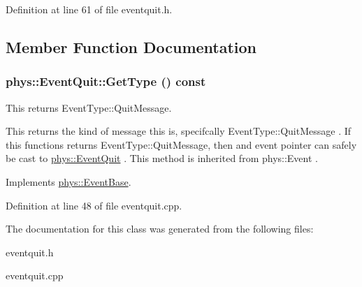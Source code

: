 Definition at line 61 of file eventquit.h.



\subsection{Member Function Documentation}
\hypertarget{classphys_1_1EventQuit_a3bfca875349e73dbda47c3c62a253e3b}{
\subsubsection[{GetType}]{ phys::EventQuit::GetType () const}}
\label{dd/dea/classphys_1_1EventQuit_a3bfca875349e73dbda47c3c62a253e3b}


This returns EventType::QuitMessage. 

This returns the kind of message this is, specifcally EventType::QuitMessage . If this functions returns EventType::QuitMessage, then and event pointer can safely be cast to \hyperlink{classphys_1_1EventQuit}{phys::EventQuit} . This method is inherited from phys::Event . 

Implements \hyperlink{classphys_1_1EventBase_a1b3d29b6ecf30f18cc3e1825a515c508}{phys::EventBase}.



Definition at line 48 of file eventquit.cpp.



The documentation for this class was generated from the following files:\begin{DoxyCompactItemize}
\item 
eventquit.h\item 
eventquit.cpp\end{DoxyCompactItemize}
